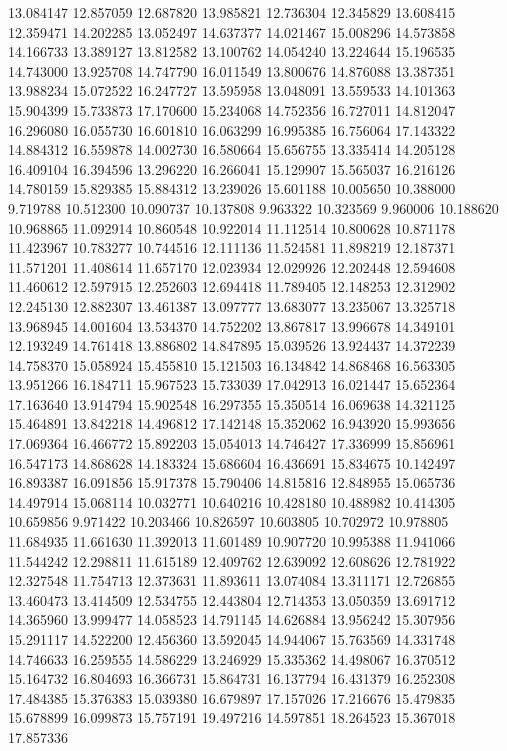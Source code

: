 13.084147
12.857059
12.687820
13.985821
12.736304
12.345829
13.608415
12.359471
14.202285
13.052497
14.637377
14.021467
15.008296
14.573858
14.166733
13.389127
13.812582
13.100762
14.054240
13.224644
15.196535
14.743000
13.925708
14.747790
16.011549
13.800676
14.876088
13.387351
13.988234
15.072522
16.247727
13.595958
13.048091
13.559533
14.101363
15.904399
15.733873
17.170600
15.234068
14.752356
16.727011
14.812047
16.296080
16.055730
16.601810
16.063299
16.995385
16.756064
17.143322
14.884312
16.559878
14.002730
16.580664
15.656755
13.335414
14.205128
16.409104
16.394596
13.296220
16.266041
15.129907
15.565037
16.216126
14.780159
15.829385
15.884312
13.239026
15.601188
10.005650
10.388000
9.719788
10.512300
10.090737
10.137808
9.963322
10.323569
9.960006
10.188620
10.968865
11.092914
10.860548
10.922014
11.112514
10.800628
10.871178
11.423967
10.783277
10.744516
12.111136
11.524581
11.898219
12.187371
11.571201
11.408614
11.657170
12.023934
12.029926
12.202448
12.594608
11.460612
12.597915
12.252603
12.694418
11.789405
12.148253
12.312902
12.245130
12.882307
13.461387
13.097777
13.683077
13.235067
13.325718
13.968945
14.001604
13.534370
14.752202
13.867817
13.996678
14.349101
12.193249
14.761418
13.886802
14.847895
15.039526
13.924437
14.372239
14.758370
15.058924
15.455810
15.121503
16.134842
14.868468
16.563305
13.951266
16.184711
15.967523
15.733039
17.042913
16.021447
15.652364
17.163640
13.914794
15.902548
16.297355
15.350514
16.069638
14.321125
15.464891
13.842218
14.496812
17.142148
15.352062
16.943920
15.993656
17.069364
16.466772
15.892203
15.054013
14.746427
17.336999
15.856961
16.547173
14.868628
14.183324
15.686604
16.436691
15.834675
10.142497
16.893387
16.091856
15.917378
15.790406
14.815816
12.848955
15.065736
14.497914
15.068114
10.032771
10.640216
10.428180
10.488982
10.414305
10.659856
9.971422
10.203466
10.826597
10.603805
10.702972
10.978805
11.684935
11.661630
11.392013
11.601489
10.907720
10.995388
11.941066
11.544242
12.298811
11.615189
12.409762
12.639092
12.608626
12.781922
12.327548
11.754713
12.373631
11.893611
13.074084
13.311171
12.726855
13.460473
13.414509
12.534755
12.443804
12.714353
13.050359
13.691712
14.365960
13.999477
14.058523
14.791145
14.626884
13.956242
15.307956
15.291117
14.522200
12.456360
13.592045
14.944067
15.763569
14.331748
14.746633
16.259555
14.586229
13.246929
15.335362
14.498067
16.370512
15.164732
16.804693
16.366731
15.864731
16.137794
16.431379
16.252308
17.484385
15.376383
15.039380
16.679897
17.157026
17.216676
15.479835
15.678899
16.099873
15.757191
19.497216
14.597851
18.264523
15.367018
17.857336
